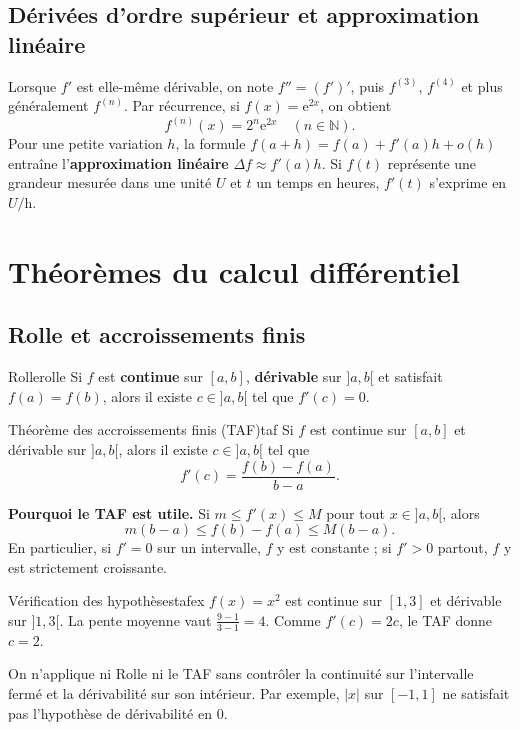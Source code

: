 \documentclass[11pt,a4paper,oneside]{article}
\newcommand{\e}{\mathrm e}
\begin{document}
\subsection{Dérivées d'ordre supérieur et approximation linéaire}
Lorsque $f'$ est elle-même dérivable, on note $f''=(f')'$, puis $f^{(3)}$, $f^{(4)}$ et plus généralement $f^{(n)}$. Par récurrence, si $f(x)=\e^{2x}$, on obtient
\[f^{(n)}(x)=2^n\e^{2x}\quad(n\in\mathbb N).\]
Pour une petite variation $h$, la formule $f(a+h)=f(a)+f'(a)h+o(h)$ entraîne l'\textbf{approximation linéaire} $\Delta f\approx f'(a)h$. Si $f(t)$ représente une grandeur mesurée dans une unité $U$ et $t$ un temps en heures, $f'(t)$ s'exprime en $U/\mathrm h$.

\section{Théorèmes du calcul différentiel}
\subsection{Rolle et accroissements finis}
\begin{theoreme}{Rolle}{rolle}
Si $f$ est \textbf{continue} sur $[a,b]$, \textbf{dérivable} sur $]a,b[$ et satisfait $f(a)=f(b)$, alors il existe $c\in]a,b[$ tel que $f'(c)=0$.
\end{theoreme}
\begin{theoreme}{Théorème des accroissements finis (TAF)}{taf}
Si $f$ est continue sur $[a,b]$ et dérivable sur $]a,b[$, alors il existe $c\in]a,b[$ tel que
\[ f'(c)=\frac{f(b)-f(a)}{b-a}. \]
\end{theoreme}
\textbf{Pourquoi le TAF est utile.} Si $m\le f'(x)\le M$ pour tout $x\in]a,b[$, alors
\[m(b-a)\le f(b)-f(a)\le M(b-a).\]
En particulier, si $f'=0$ sur un intervalle, $f$ y est constante ; si $f'>0$ partout, $f$ y est strictement croissante.
\begin{exemple}{Vérification des hypothèses}{tafex}
$f(x)=x^2$ est continue sur $[1,3]$ et dérivable sur $]1,3[$. La pente moyenne vaut $\frac{9-1}{3-1}=4$. Comme $f'(c)=2c$, le TAF donne $c=2$.
\end{exemple}
\begin{attentionbox}
On n'applique ni Rolle ni le TAF sans contrôler la continuité sur l'intervalle fermé et la dérivabilité sur son intérieur. Par exemple, $|x|$ sur $[-1,1]$ ne satisfait pas l'hypothèse de dérivabilité en $0$.
\end{attentionbox}
\end{document}

